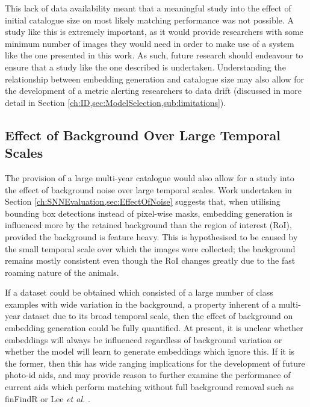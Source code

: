 This lack of data availability meant that a meaningful study into the effect of initial catalogue size on most likely matching performance was not possible. A study like this is extremely important, as it would provide researchers with some minimum number of images they would need in order to make use of a system like the one presented in this work. As such, future research should endeavour to ensure that a study like the one described is undertaken. Understanding the relationship between embedding generation and catalogue size may also allow for the development of a metric alerting researchers to data drift (discussed in more detail in Section \ref{ch:ID,sec:ModelSelection,sub:limitations}).

\subsection{Effect of Background Over Large Temporal Scales}\label{ch:Conclusion,sec:FutureWork,sub:EffectOfBackgroundOnLargeTemporalScales}

The provision of a large multi-year catalogue would also allow for a study into the effect of background noise over large temporal scales. Work undertaken in Section \ref{ch:SNNEvaluation,sec:EffectOfNoise} suggests that, when utilising bounding box detections instead of pixel-wise masks, embedding generation is influenced more by the retained background than the region of interest (RoI), provided the background is feature heavy. This is hypothesised to be caused by the small temporal scale over which the images were collected; the background remains mostly consistent even though the RoI changes greatly due to the fast roaming nature of the animals. 

If a dataset could be obtained which consisted of a large number of class examples with wide variation in the background, a property inherent of a multi-year dataset due to its broad temporal scale, then the effect of background on embedding generation could be fully quantified. At present, it is unclear whether embeddings will always be influenced regardless of background variation or whether the model will learn to generate embeddings which ignore this. If it is the former, then this has wide ranging implications for the development of future photo-id aids, and may provide reason to further examine the performance of current aids which perform matching without full background removal such as finFindR \cite{thompson_finfindr_2022} or Lee \textit{et al.} \cite{lee_backbone_2020}. 

